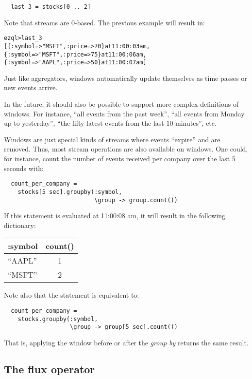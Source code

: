 \documentclass{report}
\newenvironment{evaluation}
{
  \framed
  \begin{alltt}
}
{
  \end{alltt}
  \endframed
}
\begin{document}
\begin{verbatim}
  last_3 = stocks[0 .. 2]
\end{verbatim}

Note that streams are 0-based. The previous example will result in:

\begin{evaluation}
  ezql> last_3
  [\{ :symbol => "MSFT", :price => 70 \} at 11:00:03 am,
   \{ :symbol => "MSFT", :price => 75 \} at 11:00:06 am,
   \{ :symbol => "AAPL", :price => 50 \} at 11:00:07 am]
\end{evaluation}

Just like aggregators, windows automatically update themselves as time
passes or new events arrive.

In the future, it should also be possible to support more complex
definitions of windows. For instance, ``all events from the past
week'', ``all events from Monday up to yesterday'', ``the fifty latest
events from the last 10 minutes'', etc.

Windows are just special kinds of streams where events ``expire'' and
are removed. Thus, most stream operations are also available on
windows. One could, for instance, count the number of events received
per company over the last 5 seconds with:

\begin{verbatim}
  count_per_company =
    stocks[5 sec].groupby(:symbol,
                          \group -> group.count())
\end{verbatim}

If this statement is evaluated at 11:00:08 am, it will result in the
following dictionary:

\begin{tabular}{ |l|c| }
  \hline
  :symbol & count() \\
  \hline
  ``AAPL'' & 1 \\
  ``MSFT'' & 2 \\
  \hline
\end{tabular}

Note also that the statement is equivalent to:

\begin{verbatim}
  count_per_company =
    stocks.groupby(:symbol,
                   \group -> group[5 sec].count())
\end{verbatim}

That is, applying the window before or after the \emph{group by}
returns the same result.

\subsection{The flux operator}
\label{sec:flux}
\end{document}
